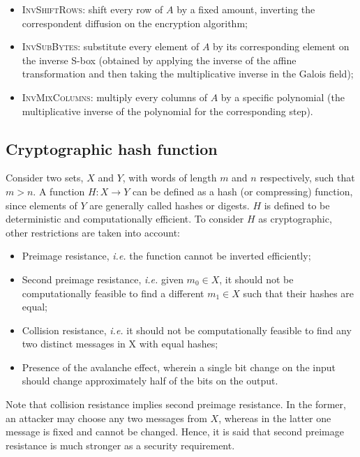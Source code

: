 \documentclass{../sftex/sftex}
\begin{document}
\begin{itemize}
  \item \textsc{InvShiftRows}: shift every row of $A$ by a fixed amount,
      inverting the correspondent diffusion on the encryption algorithm;
  \item \textsc{InvSubBytes}: substitute every element of $A$ by its
      corresponding element on the inverse S-box (obtained by applying the
        inverse of the affine transformation and then taking the multiplicative
        inverse in the Galois field);
  \item \textsc{InvMixColumns}: multiply every columns of $A$ by a specific
      polynomial (the multiplicative inverse of the polynomial for the
        corresponding step).
\end{itemize}

\subsection{Cryptographic hash function}

Consider two sets, $X$ and $Y$, with words of length $m$ and $n$ respectively,
such that $m > n$. A function $H : X \longrightarrow Y$ can be defined as a
hash (or compressing) function, since elements of $Y$ are generally called
hashes or digests. $H$ is defined to be deterministic and computationally
efficient. To consider $H$ as cryptographic, other restrictions are taken into
account:

\begin{itemize}
  \item Preimage resistance, \emph{i.e.} the function cannot be inverted
      efficiently;
  \item Second preimage resistance, \emph{i.e.} given $m_0 \in X$, it should
      not be computationally feasible to find a different $m_1 \in X$ such that
        their hashes are equal;
  \item Collision resistance, \emph{i.e.} it should not be computationally
      feasible to find any two distinct messages in X with equal hashes;
  \item Presence of the avalanche effect, wherein a single bit change on the
      input should change approximately half of the bits on the output.
\end{itemize}

Note that collision resistance implies second preimage resistance. In the
former, an attacker may choose any two messages from $X$, whereas in the latter
one message is fixed and cannot be changed. Hence, it is said that second
preimage resistance is much stronger as a security requirement.
\end{document}
